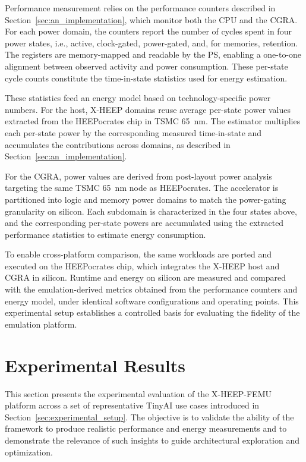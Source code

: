             Performance measurement relies on the performance counters described in Section~\ref{sec:an_implementation}, which monitor both the CPU and the CGRA. For each power domain, the counters report the number of cycles spent in four power states, i.e., active, clock-gated, power-gated, and, for memories, retention. The registers are memory-mapped and readable by the PS, enabling a one-to-one alignment between observed activity and power consumption. These per-state cycle counts constitute the time-in-state statistics used for energy estimation.

            These statistics feed an energy model based on technology-specific power numbers. For the host, \mbox{X-HEEP} domains reuse average per-state power values extracted from the \mbox{HEEPocrates} chip in TSMC \SI{65}{\nano\meter}. The estimator multiplies each per-state power by the corresponding measured time-in-state and accumulates the contributions across domains, as described in Section~\ref{sec:an_implementation}.

            For the CGRA, power values are derived from post-layout power analysis targeting the same TSMC \SI{65}{\nano\meter} node as \mbox{HEEPocrates}. The accelerator is partitioned into logic and memory power domains to match the power-gating granularity on silicon. Each subdomain is characterized in the four states above, and the corresponding per-state powers are accumulated using the extracted performance statistics to estimate energy consumption.
            
            To enable cross-platform comparison, the same workloads are ported and executed on the \mbox{HEEPocrates} chip, which integrates the \mbox{X-HEEP} host and CGRA in silicon. Runtime and energy on silicon are measured and compared with the emulation-derived metrics obtained from the performance counters and energy model, under identical software configurations and operating points. This experimental setup establishes a controlled basis for evaluating the fidelity of the emulation platform.\\

    \section{Experimental Results}
    \label{sec:experimental_results}
    
        This section presents the experimental evaluation of the \mbox{X-HEEP-FEMU} platform across a set of representative TinyAI use cases introduced in Section~\ref{sec:experimental_setup}. The objective is to validate the ability of the framework to produce realistic performance and energy measurements and to demonstrate the relevance of such insights to guide architectural exploration and optimization.
        
